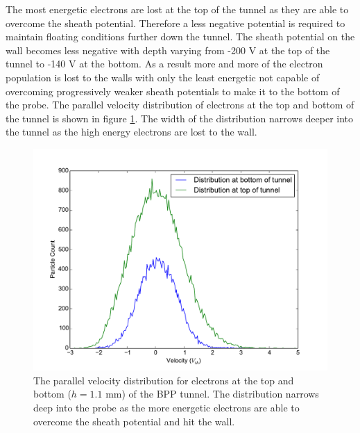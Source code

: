 The most energetic electrons are lost at the top of the tunnel as they are able to overcome the sheath potential. Therefore a less negative potential is required to maintain floating conditions further down the tunnel. The sheath potential on the wall becomes less negative with depth varying from -200 V at the top of the tunnel to -140 V at the bottom. 
As a result more and more of the electron population is lost to the walls with only the least energetic not capable of overcoming progressively weaker sheath potentials to make it to the bottom of the probe. The parallel velocity distribution of electrons at the top and bottom of the tunnel is shown in figure \ref{fig:hists}. The width of the distribution narrows deeper into the tunnel as the high energy electrons are lost to the wall.

\begin{figure}[H]
	\begin{center}
		\includegraphics[width=.75\textwidth]{electron_hists.pdf}
		\caption{The parallel velocity distribution for electrons at the top and bottom ($h = 1.1$ mm) of the BPP tunnel. The distribution narrows deep into the probe as the more energetic electrons are able to overcome the sheath potential and hit the wall. }
		\label{fig:hists}
	\end{center}
\end{figure}



